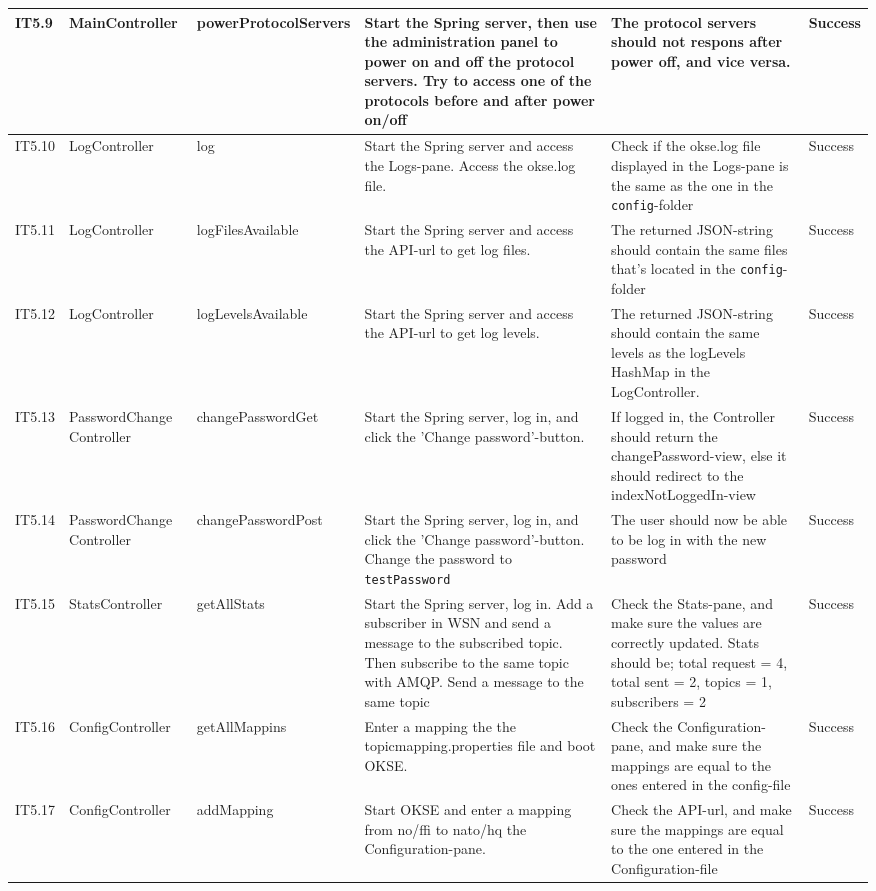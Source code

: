 \begin{table}[ht!]
\begin{tabular}{|m{0.5cm}|m{1.5cm}|m{1.5cm}|m{3cm}|m{3cm}|m{1.5cm}|}
IT5.9 & MainController & powerProtocolServers & Start the Spring server, then use the administration panel to power on and off the protocol servers. Try to access one of the protocols before and after power on/off & The protocol servers should not respons after power off, and vice versa. & Success \\ \hline
IT5.10 & LogController & log & Start the Spring server and access the Logs-pane. Access the okse.log file. & Check if the okse.log file displayed in the Logs-pane is the same as the one in the \verb!config!-folder & Success \\ \hline
IT5.11 & LogController & logFilesAvailable & Start the Spring server and access the API-url to get log files. & The returned JSON-string should contain the same files that's located in the \verb!config!-folder & Success \\ \hline
IT5.12 & LogController & logLevelsAvailable & Start the Spring server and access the API-url to get log levels. & The returned JSON-string should contain the same levels as the logLevels HashMap in the LogController. & Success \\ \hline
IT5.13 & PasswordChange Controller & changePasswordGet & Start the Spring server, log in, and click the 'Change password'-button. & If logged in, the Controller should return the changePassword-view, else it should redirect to the indexNotLoggedIn-view & Success \\ \hline
IT5.14 & PasswordChange Controller & changePasswordPost & Start the Spring server, log in, and click the 'Change password'-button. Change the password to \verb!testPassword! & The user should now be able to be log in with the new password & Success \\ \hline
IT5.15 & StatsController & getAllStats & Start the Spring server, log in. Add a subscriber in WSN and send a message to the subscribed topic. Then subscribe to the same topic with AMQP. Send a message to the same topic & Check the Stats-pane, and make sure the values are correctly updated. Stats should be; total request = 4, total sent = 2, topics = 1, subscribers = 2 & Success \\ \hline
IT5.16 & ConfigController & getAllMappins & Enter a mapping the the topicmapping.properties file and boot OKSE.  & Check the Configuration-pane, and make sure the mappings are equal to the ones entered in the config-file & Success \\ \hline
IT5.17 & ConfigController & addMapping & Start OKSE and enter a mapping from no/ffi to nato/hq the Configuration-pane. & Check the API-url, and make sure the mappings are equal to the one entered in the Configuration-file & Success \\ \hline

\end{tabular}
\end{table}
